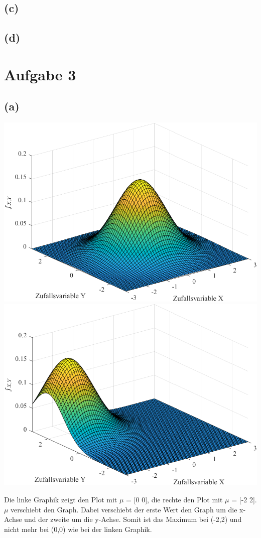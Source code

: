 \documentclass[a4paper]{scrartcl}
\begin{document}
\subsection*{(c)}
\subsection*{(d)}
\section*{Aufgabe 3}

\subsection*{(a)}
\begin{center}
	\includegraphics*[scale = 0.5]{question3a1.png}
	\includegraphics*[scale = 0.5]{question3a2.png}
\end{center}
Die linke Graphik zeigt den Plot mit $\mu$ = [0 0], die rechte den Plot mit $\mu$ = [-2 2].\\
$\mu$ verschiebt den Graph. Dabei verschiebt der erste Wert den Graph um die x-Achse und der zweite um die y-Achse. Somit ist das Maximum bei (-2,2) und nicht mehr bei (0,0) wie bei der linken Graphik.
\end{document}
